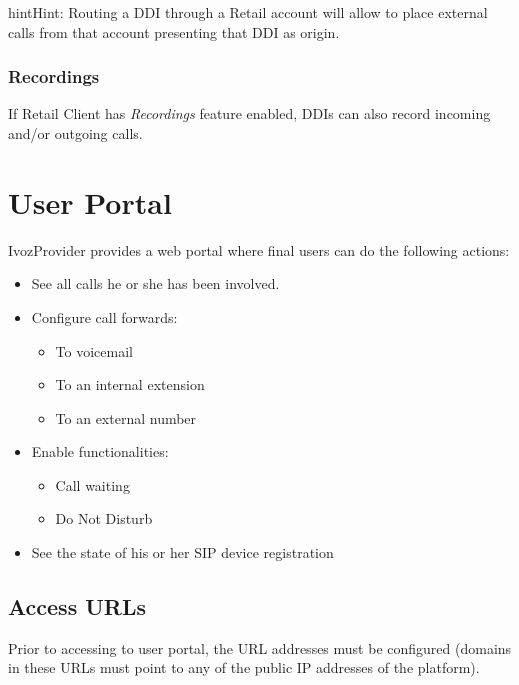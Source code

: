 \documentclass[letterpaper,10pt,english]{sphinxmanual}
\begin{document}
\begin{notice}{hint}{Hint:}
Routing a DDI through a Retail account will allow to place external calls
from that account presenting that DDI as origin.
\end{notice}


\subsection{Recordings}
\label{retail/ddis:recordings}
If Retail Client has \emph{Recordings} feature enabled, DDIs can also record incoming and/or
outgoing calls.


\chapter{User Portal}
\label{userportal/index:userportal}\label{userportal/index:user-portal}\label{userportal/index::doc}
IvozProvider provides a web portal where final users can do the following
actions:
\begin{itemize}
\item {} 
See all calls he or she has been involved.

\item {} 
Configure call forwards:
\begin{itemize}
\item {} 
To voicemail

\item {} 
To an internal extension

\item {} 
To an external number

\end{itemize}

\item {} 
Enable functionalities:
\begin{itemize}
\item {} 
Call waiting

\item {} 
Do Not Disturb

\end{itemize}

\item {} 
See the state of his or her SIP device registration

\end{itemize}


\section{Access URLs}
\label{userportal/index:access-urls}
Prior to accessing to user portal, the URL addresses must be configured (domains
in these URLs must point to any of the public IP addresses of the platform).
\end{document}
